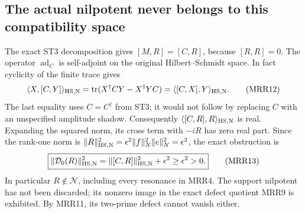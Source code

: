 \subsection{The actual nilpotent never belongs to this compatibility space}

The exact ST3 decomposition gives
$[M,R]=[C,R]$, because $[R,R]=0$.
The operator $\operatorname{ad}_C$ is self-adjoint on the
original Hilbert--Schmidt space. In fact cyclicity of the
finite trace gives
\[
\langle X,[C,Y]\rangle_{\rm HS,N}
=\operatorname{tr}(X^\dagger CY-X^\dagger YC)
=\langle[C,X],Y\rangle_{\rm HS,N}.
\tag{MRR12}
\]
The last equality uses $C=C^\dagger$ from ST3; it would not
follow by replacing $C$ with an unspecified amplitude shadow.
Consequently $\langle[C,R],R\rangle_{\rm HS,N}$ is real.
Expanding the squared norm, its cross term with $-iR$ has
zero real part. Since the rank-one norm is
$\|R\|_{\rm HS,N}^2=\epsilon^2\|f\|_N^2\|e\|_N^2=\epsilon^2$,
the exact obstruction is
\[
\boxed{
\|\mathcal D_0(R)\|_{\rm HS,N}^2
=\|[C,R]\|_{\rm HS,N}^2+\epsilon^2
\ge\epsilon^2>0.}
\tag{MRR13}
\]
In particular $R\notin\mathscr N$, including every resonance
in MRR4. The support nilpotent has not been discarded; its
nonzero image in the exact defect quotient MRR9 is exhibited.
By MRR11, its two-prime defect cannot vanish either.

